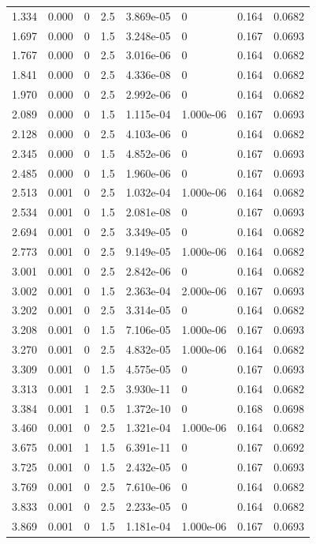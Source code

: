 \documentclass[preview]{standalone}
\begin{document}
{{\begin{tabular}{L{1.2cm}C{1.2cm} C{0.3cm}C{0.5cm} C{1.4cm}C{1.4cm} C{1.4cm}C{1.4cm}}
  1.334  &  0.000  & 0     & 2.5 &  3.869e-05  & 0  & 0.164 &  0.0682   \\ 
  1.697  &  0.000  & 0     & 1.5 &  3.248e-05  & 0  & 0.167 &  0.0693   \\ 
  1.767  &  0.000  & 0     & 2.5 &  3.016e-06  & 0  & 0.164 &  0.0682   \\ 
  1.841  &  0.000  & 0     & 2.5 &  4.336e-08  & 0  & 0.164 &  0.0682   \\ 
  1.970  &  0.000  & 0     & 2.5 &  2.992e-06  & 0  & 0.164 &  0.0682   \\ 
  2.089  &  0.000  & 0     & 1.5 &  1.115e-04  & 1.000e-06  & 0.167 &  0.0693   \\ 
  2.128  &  0.000  & 0     & 2.5 &  4.103e-06  & 0  & 0.164 &  0.0682   \\ 
  2.345  &  0.000  & 0     & 1.5 &  4.852e-06  & 0  & 0.167 &  0.0693   \\ 
  2.485  &  0.000  & 0     & 1.5 &  1.960e-06  & 0  & 0.167 &  0.0693   \\ 
  2.513  &  0.001  & 0     & 2.5 &  1.032e-04  & 1.000e-06  & 0.164 &  0.0682   \\ 
  2.534  &  0.001  & 0     & 1.5 &  2.081e-08  & 0  & 0.167 &  0.0693   \\ 
  2.694  &  0.001  & 0     & 2.5 &  3.349e-05  & 0  & 0.164 &  0.0682   \\ 
  2.773  &  0.001  & 0     & 2.5 &  9.149e-05  & 1.000e-06  & 0.164 &  0.0682   \\ 
  3.001  &  0.001  & 0     & 2.5 &  2.842e-06  & 0  & 0.164 &  0.0682   \\ 
  3.002  &  0.001  & 0     & 1.5 &  2.363e-04  & 2.000e-06  & 0.167 &  0.0693   \\ 
  3.202  &  0.001  & 0     & 2.5 &  3.314e-05  & 0  & 0.164 &  0.0682   \\ 
  3.208  &  0.001  & 0     & 1.5 &  7.106e-05  & 1.000e-06  & 0.167 &  0.0693   \\ 
  3.270  &  0.001  & 0     & 2.5 &  4.832e-05  & 1.000e-06  & 0.164 &  0.0682   \\ 
  3.309  &  0.001  & 0     & 1.5 &  4.575e-05  & 0  & 0.167 &  0.0693   \\ 
  3.313  &  0.001  & 1     & 2.5 &  3.930e-11  & 0  & 0.164 &  0.0682   \\ 
  3.384  &  0.001  & 1     & 0.5 &  1.372e-10  & 0  & 0.168 &  0.0698   \\ 
  3.460  &  0.001  & 0     & 2.5 &  1.321e-04  & 1.000e-06  & 0.164 &  0.0682   \\ 
  3.675  &  0.001  & 1     & 1.5 &  6.391e-11  & 0  & 0.167 &  0.0692   \\ 
  3.725  &  0.001  & 0     & 1.5 &  2.432e-05  & 0  & 0.167 &  0.0693   \\ 
  3.769  &  0.001  & 0     & 2.5 &  7.610e-06  & 0  & 0.164 &  0.0682   \\ 
  3.833  &  0.001  & 0     & 2.5 &  2.233e-05  & 0  & 0.164 &  0.0682   \\ 
  3.869  &  0.001  & 0     & 1.5 &  1.181e-04  & 1.000e-06  & 0.167 &  0.0693   \\ 
\hline 
\end{tabular} 

}}
\end{document}
